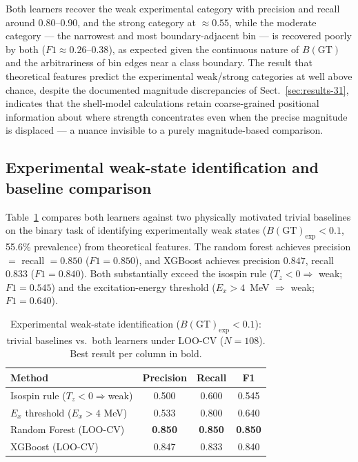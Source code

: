 \documentclass[10pt,twocolumn]{article}
\begin{document}
Both learners recover the weak experimental category with precision and recall around 0.80--0.90, and the strong category at $\approx 0.55$, while the moderate category --- the narrowest and most boundary-adjacent bin --- is recovered poorly by both ($F1 \approx 0.26$--$0.38$), as expected given the continuous nature of $B(\mathrm{GT})$ and the arbitrariness of bin edges near a class boundary. The result that theoretical features predict the experimental weak/strong categories at well above chance, despite the documented magnitude discrepancies of Sect.~\ref{sec:results-31}, indicates that the shell-model calculations retain coarse-grained positional information about where strength concentrates even when the precise magnitude is displaced --- a nuance invisible to a purely magnitude-based comparison.

\subsection{Experimental weak-state identification and baseline comparison}
\label{sec:results-34}

Table~\ref{tab:4} compares both learners against two physically motivated trivial baselines on the binary task of identifying experimentally weak states ($B(\mathrm{GT})_{\mathrm{exp}} < 0.1$, 55.6\% prevalence) from theoretical features. The random forest achieves precision $=$ recall $= 0.850$ ($F1=0.850$), and XGBoost achieves precision $0.847$, recall $0.833$ ($F1=0.840$). Both substantially exceed the isospin rule ($T_z<0 \Rightarrow$ weak; $F1=0.545$) and the excitation-energy threshold ($E_x>4$~MeV $\Rightarrow$ weak; $F1=0.640$).

\begin{table}[htbp]
\centering
\caption{Experimental weak-state identification ($B(\mathrm{GT})_{\mathrm{exp}}<0.1$): trivial baselines vs.\ both learners under LOO-CV ($N=108$). Best result per column in bold.}
\label{tab:4}
\begin{tabular}{lccc}
\toprule
Method & Precision & Recall & F1 \\
\midrule
Isospin rule ($T_z<0\Rightarrow$weak)     & 0.500 & 0.600 & 0.545 \\
$E_x$ threshold ($E_x{>}4$ MeV)           & 0.533 & 0.800 & 0.640 \\
Random Forest (LOO-CV)                    & \textbf{0.850} & \textbf{0.850} & \textbf{0.850} \\
XGBoost (LOO-CV)                          & 0.847 & 0.833 & 0.840 \\
\bottomrule
\end{tabular}
\end{table}
\end{document}
